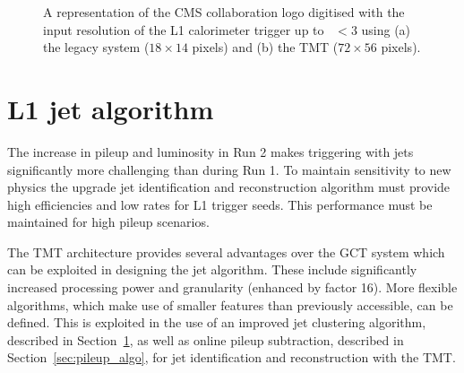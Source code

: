 \begin{figure}
\centering
{} \quad
{} 
\caption{A representation of the CMS collaboration logo digitised with the input resolution of the L1 calorimeter trigger up to 
\etaabs~$< 3$ using (a) the legacy system ($18 \times 14$ pixels) and (b) the TMT ($72 \times 56$ pixels).}
\label{fig:inputres}
\end{figure}

\section{L1 jet algorithm}
\label{sec:jet_algo}

The increase in pileup and luminosity in Run 2 makes triggering with jets
significantly more challenging than during Run 1. To maintain sensitivity to
new physics the upgrade jet identification and reconstruction 
algorithm must provide high efficiencies and low rates for L1 trigger seeds.
This performance must be maintained for high pileup scenarios.

The TMT architecture provides several advantages over the GCT system which can be 
exploited in designing the jet algorithm. These include significantly increased processing power
and granularity (enhanced by factor 16). More flexible algorithms, which 
make use of smaller features than previously accessible, can be defined. This is exploited in the 
use of an improved jet clustering algorithm, described in Section~\ref{sec:jet_algo}, as well as 
online pileup subtraction, described in Section~\ref{sec:pileup_algo}, for jet 
identification and reconstruction with the TMT.

